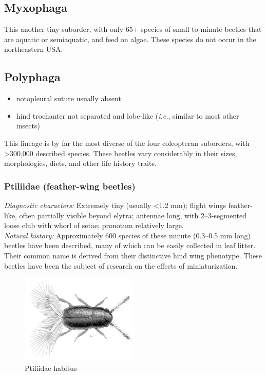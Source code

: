 \documentclass[letterpaper, 11pt]{article}
\begin{document}
\clearpage
\subsection{Myxophaga}
This another tiny suborder, with only 65+ species of small to minute beetles that are aquatic or semiaquatic, and feed on algae. These species do not occur in the northeastern USA.

\subsection{Polyphaga}
\begin{itemize}
\item notopleural suture usually absent
\item hind trochanter not separated and lobe-like (\textit{i.e.}, similar to most other insects) 
\end{itemize}
This lineage is by far the most diverse of the four coleopteran suborders, with \textgreater300,000 described species. These beetles vary considerably in their sizes, morphologies, diets, and other life history traits.

\subsubsection{Ptiliidae (feather-wing beetles)}
\noindent{}\textit{Diagnostic characters:} Extremely tiny (usually \textless1.2 mm); flight wings feather-like, often partially visible beyond elytra; antennae long, with 2--3-segmented loose club with whorl of setae; pronotum relatively large.\\

\noindent{}\textit{Natural history:} Approximately 600 species of these minute (0.3--0.5 mm long) beetles have been described, many of which can be easily collected in leaf litter. Their common name is derived from their distinctive hind wing phenotype. These beetles have been the subject of research on the effects of miniaturization.

\begin{figure}[ht!]
  \centering
    \includegraphics[width=0.5\textwidth]{PtiliidHabitus2}
  \caption{Ptiliidae habitus \citep[Modified from Fig. 17 in][]{reitter1908fauna}}
  \label{fig:ptiliids}
\end{figure}
\end{document}
